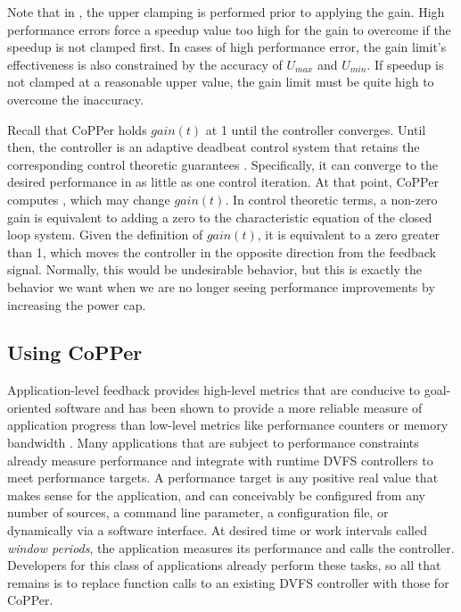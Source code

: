 Note that in , the upper clamping is performed prior to applying the gain.
High performance errors force a speedup value too high for the gain to overcome if the speedup is not clamped first.
In cases of high performance error, the gain limit's effectiveness is also constrained by the accuracy of $U_{max}$ and $U_{min}$.
If speedup is not clamped at a reasonable upper value, the gain limit must be quite high to overcome the inaccuracy.

Recall that CoPPer holds $gain(t)$ at 1 until the controller converges.
Until then, the controller is an adaptive deadbeat control system that retains the corresponding control theoretic guarantees \cite{ICSE2014}.
Specifically, it can converge to the desired performance in as little as one control iteration.
At that point, CoPPer computes , which may change $gain(t)$.
In control theoretic terms, a non-zero gain is equivalent to adding a zero to the characteristic equation of the closed loop system.
Given the definition of $gain(t)$, it is equivalent to a zero greater than 1, which moves the controller in the opposite direction from the feedback signal.
Normally, this would be undesirable behavior, but this is exactly the behavior we want when we are no longer seeing performance improvements by increasing the power cap.


\subsection{Using CoPPer}
\label{sec:copper-implementation}

Application-level feedback provides high-level metrics that are conducive to goal-oriented software and has been shown to provide a more reliable measure of application progress than low-level metrics like performance counters or memory bandwidth \cite{PTRADE}.
Many applications that are subject to performance constraints already measure performance and integrate with runtime DVFS controllers to meet performance targets.
A performance target is any positive real value that makes sense for the application, and can conceivably be configured from any number of sources, \eg a command line parameter, a configuration file, or dynamically via a software interface.
At desired time or work intervals called \emph{window periods}, the application measures its performance and calls the controller.
Developers for this class of applications already perform these tasks, so all that remains is to replace function calls to an existing DVFS controller with those for CoPPer.

